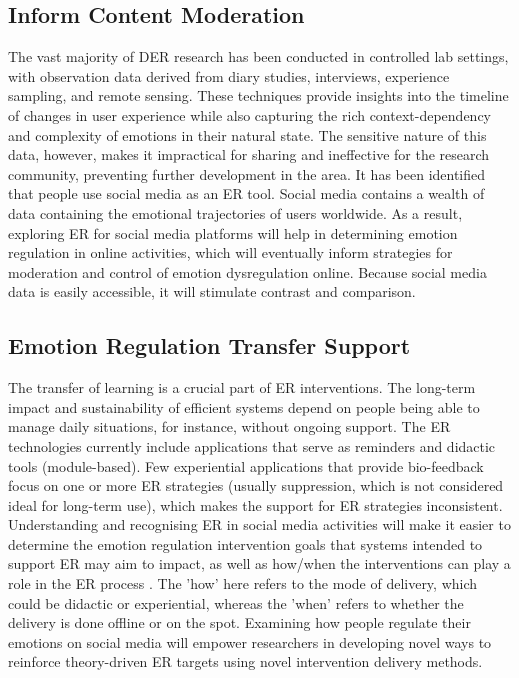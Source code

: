 \documentclass[lettersize,journal]{IEEEtran}
\begin{document}
\subsection{Inform Content Moderation}
The vast majority of DER research has been conducted in controlled lab settings, with observation data derived from diary studies, interviews, experience sampling, and remote sensing. These techniques provide insights into the timeline of changes in user experience while also capturing the rich context-dependency and complexity of emotions in their natural state. The sensitive nature of this data, however, makes it impractical for sharing and ineffective for the research community, preventing further development in the area. It has been identified that people use social media as an ER tool. Social media contains a wealth of data containing the emotional trajectories of users worldwide. As a result, exploring ER for social media platforms will help in determining emotion regulation in online activities, which will eventually inform strategies for moderation and control of emotion dysregulation online. Because social media data is easily accessible, it will stimulate contrast and comparison.

\subsection{Emotion Regulation Transfer Support}
The transfer of learning is a crucial part of ER interventions. The long-term impact and sustainability of efficient systems depend on people being able to manage daily situations, for instance, without ongoing support. The ER technologies currently include applications that serve as reminders and didactic tools (module-based). Few experiential applications that provide bio-feedback focus on one or more ER strategies (usually suppression, which is not considered ideal for long-term use), which makes the support for ER strategies inconsistent. Understanding and recognising ER in social media activities will make it easier to determine the emotion regulation intervention goals that systems intended to support ER may aim to impact, as well as how/when the interventions can play a role in the ER process \cite{slovak2022designing}. The 'how' here refers to the mode of delivery, which could be didactic or experiential, whereas the 'when' refers to whether the delivery is done offline or on the spot. Examining how people regulate their emotions on social media will empower researchers in developing novel ways to reinforce theory-driven ER targets using novel intervention delivery methods.
\end{document}
